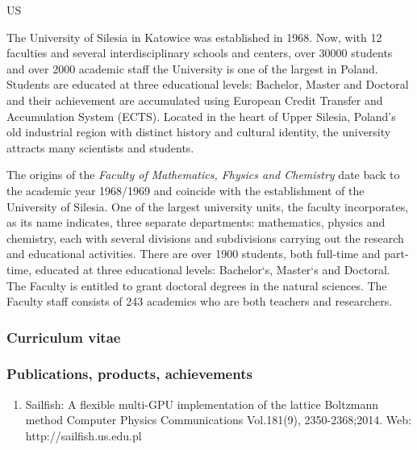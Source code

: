 \begin{sitedescription}{US}

The University of Silesia in Katowice was established in 1968. Now,
with 12 faculties and several interdisciplinary schools and centers,
over 30000 students and over 2000 academic staff the University is one
of the largest in Poland. Students are educated at three educational
levels: Bachelor, Master and Doctoral and their achievement are
accumulated using European Credit Transfer and Accumulation System
(ECTS). Located in the heart of Upper Silesia, Poland’s old industrial
region with distinct history and cultural identity, the university
attracts many scientists and students.

The origins of the {\em Faculty of Mathematics, Fhysics and Chemistry} date
back to the academic year 1968/1969 and coincide with the
establishment of the University of Silesia. One of the largest
university units, the faculty incorporates, as its name indicates,
three separate departments: mathematics, physics and chemistry, each
with several divisions and subdivisions carrying out the research and
educational activities. There are over 1900 students, both full-time
and part-time, educated at three educational levels: Bachelor`s,
Master`s and Doctoral. The Faculty is entitled to grant doctoral
degrees in the natural sciences. The Faculty staff consists of 243
academics who are both teachers and researchers.

\subsubsection*{Curriculum vitae}





%
%

\subsubsection*{Publications, products, achievements}


\begin{enumerate}

\item Sailfish: A flexible multi-GPU implementation of the lattice Boltzmann method
 Computer Physics Communications Vol.181(9), 2350-2368;2014. Web: http://sailfish.us.edu.pl 


\end{enumerate}
\end{sitedescription}
